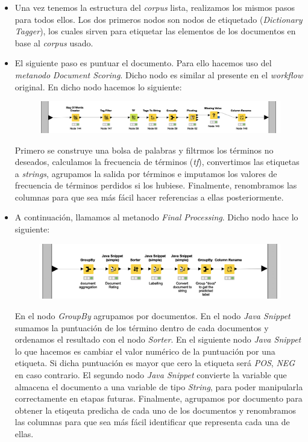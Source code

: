 \documentclass[11pt]{article}
\begin{document}
\begin{itemize}
	\item Una vez tenemos la estructura del \textit{corpus} lista, realizamos los mismos pasos para todos ellos. Los dos primeros nodos son nodos de etiquetado (\textit{Dictionary Tagger}), los cuales sirven para etiquetar las elementos de los documentos en base al \textit{corpus} usado.
	\item El siguiente paso es puntuar el documento. Para ello hacemos uso del \textit{metanodo} \textit{Document Scoring}. Dicho nodo es similar al presente en el \textit{workflow} original. En dicho nodo hacemos lo siguiente:
	
	\begin{figure}[H]
		\centering
		\includegraphics[width=0.9\linewidth]{images/document_scoring.png}
	\end{figure}
	
	Primero se construye una bolsa de palabras y filtrmos los términos no deseados, calculamos la frecuencia de términos (\textit{tf}), convertimos las etiquetas a \textit{strings}, agrupamos la salida por términos e imputamos los valores de frecuencia de términos perdidos si los hubiese. Finalmente, renombramos las columnas para que sea más fácil hacer referencias a ellas posteriormente.
	
	\item A continuación, llamamos al metanodo \textit{Final Processing}. Dicho nodo hace lo siguiente:
	
	\begin{figure}[H]
		\centering
		\includegraphics[width=0.9\linewidth]{images/final_processing.png}
	\end{figure}
	
	En el nodo \textit{GroupBy} agrupamos por documentos. En el nodo \textit{Java Snippet} sumamos la puntuación de los término dentro de cada documentos y ordenamos el resultado con el nodo \textit{Sorter}. En el siguiente nodo \textit{Java Snippet} lo que hacemos es cambiar el valor numérico de la puntuación por una etiqueta. Si dicha puntuación es mayor que cero la etiqueta será \textit{POS}, \textit{NEG} en caso contrario. El segundo nodo \textit{Java Snippet} convierte la variable que almacena el documento a una variable de tipo \textit{String}, para poder manipularla correctamente en etapas futuras. Finalmente, agrupamos por documento para obtener la etiqeuta predicha de cada uno de los documentos y  renombramos las columnas para que sea más fácil identificar que representa cada una de ellas.
	

\end{itemize}
\end{document}
